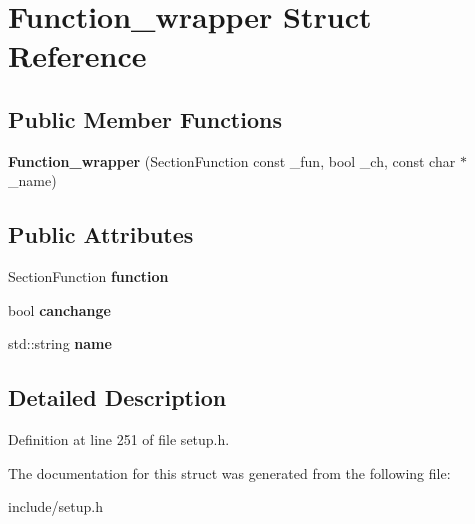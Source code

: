 \hypertarget{structFunction__wrapper}{\section{Function\-\_\-wrapper Struct Reference}
\label{structFunction__wrapper}
}
\subsection*{Public Member Functions}
\begin{DoxyCompactItemize}
\item 
\hypertarget{structFunction__wrapper_a42e855bf8f4ff2cdb3b3fc61982a0e2a}{{\bfseries Function\-\_\-wrapper} (Section\-Function const \-\_\-fun, bool \-\_\-ch, const char $\ast$\-\_\-name)}\label{structFunction__wrapper_a42e855bf8f4ff2cdb3b3fc61982a0e2a}

\end{DoxyCompactItemize}
\subsection*{Public Attributes}
\begin{DoxyCompactItemize}
\item 
\hypertarget{structFunction__wrapper_a37c15a5a48deb464bfbcf0ac2aeed1f4}{Section\-Function {\bfseries function}}\label{structFunction__wrapper_a37c15a5a48deb464bfbcf0ac2aeed1f4}

\item 
\hypertarget{structFunction__wrapper_a07ef638dcc9ab91a2649aeebf09685a6}{bool {\bfseries canchange}}\label{structFunction__wrapper_a07ef638dcc9ab91a2649aeebf09685a6}

\item 
\hypertarget{structFunction__wrapper_a5272f1f398f64bf611d1b6d3fd8848cb}{std\-::string {\bfseries name}}\label{structFunction__wrapper_a5272f1f398f64bf611d1b6d3fd8848cb}

\end{DoxyCompactItemize}


\subsection{Detailed Description}


Definition at line 251 of file setup.\-h.



The documentation for this struct was generated from the following file\-:\begin{DoxyCompactItemize}
\item 
include/setup.\-h\end{DoxyCompactItemize}
